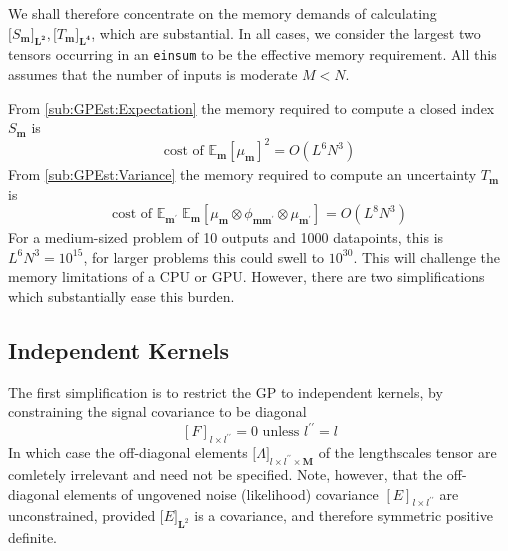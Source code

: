 \documentclass[preprint,12pt]{elsarticle}
\newcommand*{\x}{\times}
\newcommand*{\mi}[1]{\mathbf{#1}}
\newcommand*{\te}[2][]{\left\lbrack{#2}\right\rbrack_{#1}}
\newcommand*{\tte}[2][]{\lbrack{#2}\rbrack_{#1}}
\newcommand{\T}[1]{\text{#1}}
\newcommand*{\evt}[3][]{\mathbb{E}_{#3}^{#1}\!#2}
\begin{document}
    We shall therefore concentrate on the memory demands of calculating $\tte[\mi{L^{2}}]{S_{\mi{m}}},\tte[\mi{L^{4}}]{T_{\mi{m}}}$, which are substantial. In all cases, we consider the largest two tensors occurring in an {\tt einsum} to be the effective memory requirement. All this assumes that the number of inputs is moderate $M<N$.

    From \cref{sub:GPEst:Expectation} the memory required to compute a closed index $S_{\mi{m}}$ is
    \begin{equation*}
        \T{cost of }\evt{\te[]{\mu_{\mi{m}}}^{2}}{\mi{m}} = O(L^{6}N^{3})
    \end{equation*}
    From \cref{sub:GPEst:Variance} the memory required to compute an uncertainty $T_{\mi{m}}$ is
    \begin{equation*}
        \T{cost of }\evt{\;\evt{\te[]{\mu_{\mi{m}} \otimes \phi_{\mi{mm^{\prime}}} \otimes \mu_{\mi{m^{\prime}}}}}}{\mi{m^{\prime}}}{\mi{m}} = O(L^{8}N^{3})
    \end{equation*}
    For a medium-sized problem of 10 outputs and 1000 datapoints, this is $L^{6}N^{3}=10^{15}$, for larger problems this could swell to $10^{30}$. This will challenge the memory limitations of a CPU or GPU. However, there are two simplifications which substantially ease this burden.

    \subsection{Independent Kernels}\label{sub:Complexity:Indep}
    The first simplification is to restrict the GP to independent kernels, by constraining the signal covariance to be diagonal 
    \begin{equation*}
        \te[l\x l^{\prime\prime}]{F} = 0 \T{ unless } l^{\prime\prime} = l
    \end{equation*}
    In which case the off-diagonal elements $\tte[l\x l^{\prime\prime}\x\mi{M}]{\Lambda}$ of the lengthscales tensor are comletely irrelevant and need not be specified. Note, however, that the off-diagonal elements of ungovened noise (likelihood) covariance $\te[l\x l^{\prime\prime}]{E}$ are unconstrained, provided $\tte[\mi{L}^{2}]{E}$ is a covariance, and therefore symmetric positive definite.
\end{document}
